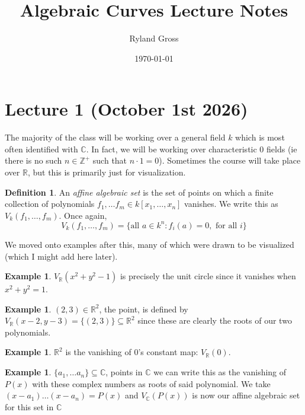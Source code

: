 \documentclass[11pt,a4paper]{article}
\title{Algebraic Curves Lecture Notes}
\author{Ryland Gross}
\date{\today}
\theoremstyle{plain}
\theoremstyle{definition}
\newtheorem{definition}[theorem]{Definition}
\newtheorem{example}[theorem]{Example}
\theoremstyle{remark}
\begin{document}
\maketitle

\section{Lecture 1 (October 1st 2026)}

\noindent
The majority of the class will be working over a general field $k$ which is most often identified with $\mathbb{C}$. In fact, we will be working over characteristic $0$ fields (ie there is no such $n \in \mathbb{Z}^+$ such that $n\cdot 1 = 0$). Sometimes the course will take place over $\mathbb{R}$, but this is primarily just for visualization.

\begin{definition}
    An \emph{affine algebraic set} is the set of points on which a finite collection of polynomials $f_1, \dots f_m \in k[x_1,\dots,x_n]$ vanishes. We write this as $V_k(f_1, \dots,f_m)$. Once again, $$V_k(f_1,\dots,f_m)=\{\text{all } a \in k^n : f_i(a) = 0, \text{ for all } i\}$$ 
\end{definition}

\medskip
\noindent
We moved onto examples after this, many of which were drawn to be visualized (which I might add here later).

\begin{example}
    $V_\mathbb{R}(x^2+y^2-1)$ is precisely the unit circle since it vanishes when $x^2 + y^2 = 1$.
\end{example}

\begin{example}
    $(2,3) \in \mathbb{R}^2$, the point, is defined by $V_\mathbb{R}(x-2,y-3) = \{(2,3)\} \subseteq \mathbb{R}^2$ since these are clearly the roots of our two polynomials.
\end{example}

\begin{example}
    $\mathbb{R}^2$ is the vanishing of $0$'s constant map: $V_\mathbb{R}(0)$.
\end{example}

\begin{example}
    $\{a_1, \dots a_n\} \subseteq \mathbb{C}$, points in $\mathbb{C}$ we can write this as the vanishing of $P(x)$ with these complex numbers as roots of said polynomial. We take $(x-a_1)\dots(x-a_n) = P(x)$ and $V_\mathbb{C}(P(x))$ is now our affine algebraic set for this set in $\mathbb{C}$
\end{example}
\end{document}
